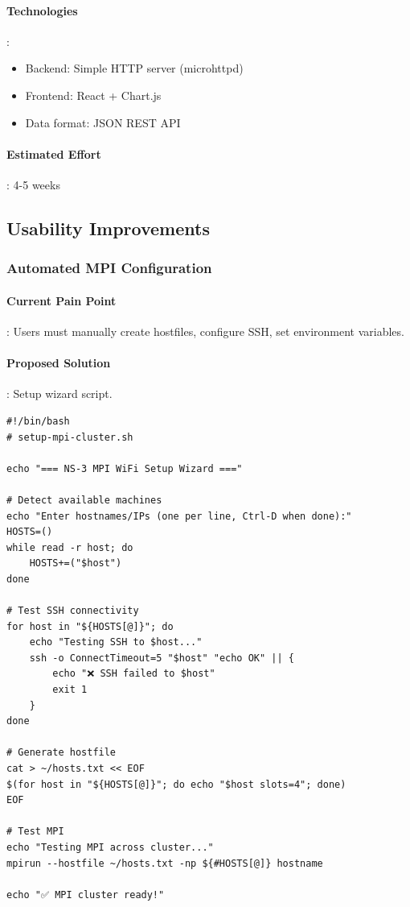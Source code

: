\paragraph{Technologies}:
\begin{itemize}
    \item Backend: Simple HTTP server (microhttpd)
    \item Frontend: React + Chart.js
    \item Data format: JSON REST API
\end{itemize}

\paragraph{Estimated Effort}: 4-5 weeks

\subsection{Usability Improvements}

\subsubsection{Automated MPI Configuration}

\paragraph{Current Pain Point}:
Users must manually create hostfiles, configure SSH, set environment variables.

\paragraph{Proposed Solution}:
Setup wizard script.

\begin{lstlisting}[style=bash]
#!/bin/bash
# setup-mpi-cluster.sh

echo "=== NS-3 MPI WiFi Setup Wizard ==="

# Detect available machines
echo "Enter hostnames/IPs (one per line, Ctrl-D when done):"
HOSTS=()
while read -r host; do
    HOSTS+=("$host")
done

# Test SSH connectivity
for host in "${HOSTS[@]}"; do
    echo "Testing SSH to $host..."
    ssh -o ConnectTimeout=5 "$host" "echo OK" || {
        echo "❌ SSH failed to $host"
        exit 1
    }
done

# Generate hostfile
cat > ~/hosts.txt << EOF
$(for host in "${HOSTS[@]}"; do echo "$host slots=4"; done)
EOF

# Test MPI
echo "Testing MPI across cluster..."
mpirun --hostfile ~/hosts.txt -np ${#HOSTS[@]} hostname

echo "✅ MPI cluster ready!"
\end{lstlisting}

